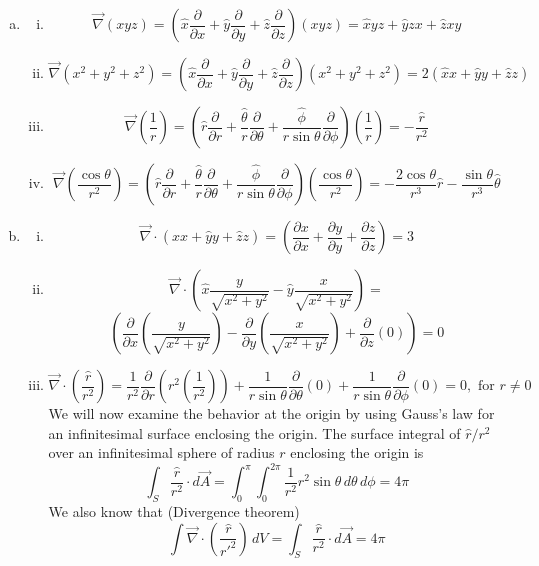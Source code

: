 \documentclass{esg8022pset}
\newcommand{\Kgrad}{\left(\hat{x} \frac{\partial}{\partial x} + \hat{y} \frac{\partial}{\partial y} + \hat{z} \frac{\partial}{\partial z}\right)}
\newcommand{\Kdiv}[6]{{#4}\left(\frac{\partial {#1}}{\partial x} {#5} \frac{\partial {#2}}{\partial y} {#6}\frac{\partial #3}{\partial z} \right)}
\newcommand{\KKdiv}[6]{{#4}\left(\frac{\partial}{\partial x}{#1} {#5} \frac{\partial}{\partial y}{#2} {#6}\frac{\partial}{\partial z}{#3} \right)}
\newcommand{\dtheta}{\frac{\partial}{\partial \theta}}
\newcommand{\dr}{\frac{\partial}{\partial r}}
\begin{document}
\begin{solution}
  \begin{enumerate}[(a)]
    \item 
      \begin{enumerate}[(i)]
        \item $${\vec{\nabla} (xyz)} = \Kgrad \left( xyz\right) = \hat x yz + \hat y zx + \hat z xy $$
        \item $${\vec{\nabla} \left( x^2 + y^2 + z^2 \right)} = \Kgrad \left( x^2 + y^2 + z^2\right) = 2\left( \hat x x + \hat y y + \hat z z \right) $$
        \item $${\vec{\nabla}}\left( \frac{1}{r} \right) =  \left( \hat r \dr + \frac{\hat\theta}{r} \dtheta + \frac{\hat\phi}{r \sin \theta} \frac{\partial}{\partial \phi} \right)\left( \frac{1}{r} \right) = -\frac{\hat r}{r^2} $$
        \item $${\vec{\nabla}}\left( \frac{\cos \theta}{r^2} \right) =  \left( \hat r \dr + \frac{\hat\theta}{r} \dtheta + \frac{\hat\phi}{r \sin \theta} \frac{\partial}{\partial \phi} \right)\left( \frac{\cos \theta}{r^2} \right) = -\frac{2 \cos \theta}{r^3}\hat r -\frac{ \sin \theta}{r^3}\hat\theta $$
      \end{enumerate}
    \item
      \begin{enumerate}[(i)]
        \item $${\vec{\nabla}\cdot \left( \hat{x} x + \hat{y} y + \hat{z} z \right)} = \Kdiv{x}{y}{z}{}{+}{+} = 3 $$
        \item $$\vec{\nabla}\cdot \left(\hat{x} \frac{y}{\sqrt{x^2+y^2}} - \hat{y} \frac{x}{\sqrt{x^2+y^2}}\right) = $$ $$\KKdiv{\left(\frac{y}{\sqrt{x^2+y^2}}\right)}{\left(\frac{x}{\sqrt{x^2+y^2}}\right)}{(0)}{}{-}{+} = 0$$
        \item $$\vec{\nabla}\cdot {\left(  \frac{\hat r}{r^2}  \right)} = \frac{1}{r^2} \dr\left( r^2 \left( \frac{1}{r^2} \right) \right) + \frac{1}{r \sin \theta} \dtheta\left( 0 \right) + \frac{1}{r \sin \theta} \frac{\partial}{\partial \phi}\left( 0 \right) = 0, \text{ for }r \neq  0 $$
          We will now examine the behavior at the origin by using Gauss's law for an infinitesimal surface enclosing the origin. The surface integral of $\hat r/r^2$ over an infinitesimal sphere of radius $r$ enclosing the origin is
          $$ \int_{S} \frac{\hat r}{r^2} \cdot d\vec{A} = \int_{0}^{\pi} \int_{0}^{2 \pi} \frac{1}{r^2} r^2\sin \theta\,d\theta\,d\phi = 4 \pi $$
          We also know that (Divergence theorem)
          \begin{equation}\int \vec{\nabla}\cdot {\left(  \frac{\hat r}{r'^2}  \right)}\,dV = \int_{S} \frac{\hat r}{r^2} \cdot d\vec{A} =4 \pi \label{eq:Glaw}\end{equation}

\end{enumerate}
\end{enumerate}
\end{solution}
\end{document}
